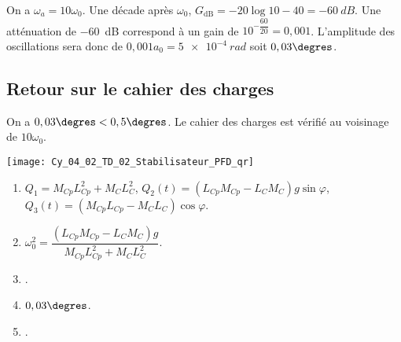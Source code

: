 \ifprof
\begin{corrige}
On a $\omega_a=10\omega_0$. Une décade après $\omega_0$, $G_{\text{dB}}=-20\log 10 - 40 = \SI{-60}{dB}$. Une atténuation de \SI{-60}{dB} correspond à un gain de $10^{-\dfrac{60}{20}}=0,001$. L'amplitude des oscillations sera donc de $0,001 a_0 = \SI{5e-4}{rad}$ soit $0,03 \degres$.


\end{corrige}
\else
\fi


\subsection*{Retour sur le cahier des charges}

\ifprof
\begin{corrige}
On a $0,03 \degres < 0,5\degres$. Le cahier des charges est vérifié au voisinage de $10\omega_0$.
\end{corrige}
\else
\fi


\ifprof
\else
\begin{marginfigure}
\centering
\texttt{[image: Cy\_04\_02\_TD\_02\_Stabilisateur\_PFD\_qr]}
\end{marginfigure}
\fi


\ifcolle
\else
\begin{solution}
\begin{enumerate}
\item $Q_1 = M_{Cp}L_{Cp}^2+M_{C}L_{C}^2 $, $Q_2(t)=\left(   L_{Cp}M_{Cp} - L_CM_C \right)g \sin \varphi$, 
$Q_3(t)= \left(M_{Cp}L_{Cp}- M_CL_C\right)  \cos\varphi$.
\item $\omega_0^2 = \dfrac{\left(   L_{Cp}M_{Cp} - L_CM_C \right)g }{ M_{Cp}L_{Cp}^2+M_{C}L_{C}^2}$.
\item .
\item $0,03 \degres$.
\item .
\end{enumerate}
\end{solution}
\fi
